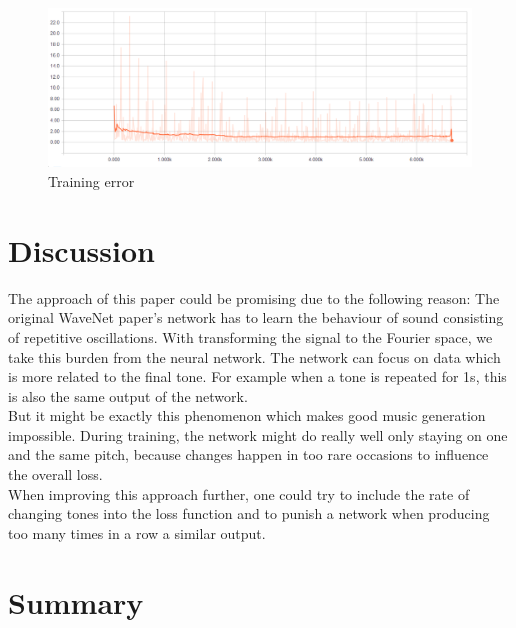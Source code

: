 \documentclass[10pt,conference,compsocconf]{IEEEtran}
\begin{document}
\begin{figure}[tbp]
  \centering
  \includegraphics[width=\textwidth]{figures/loss.png}
  \caption{Training error}
  \label{fig:training_error}
\end{figure}

\section{Discussion}
The approach of this paper could be promising due to the following reason: The original WaveNet paper's network has to learn the behaviour of sound consisting of repetitive oscillations. With transforming the signal to the Fourier space, we take this burden from the neural network. The network can focus on data which is more related to the final tone. For example when a tone is repeated for 1s, this is also the same output of the network.\\
But it might be exactly this phenomenon which makes good music generation impossible. During training, the network might do really well only staying on one and the same pitch, because changes happen in too rare occasions to influence the overall loss.\\
When improving this approach further, one could try to include the rate of changing tones into the loss function and to punish a network when producing too many times in a row a similar output.\\

\section{Summary}




\end{document}
